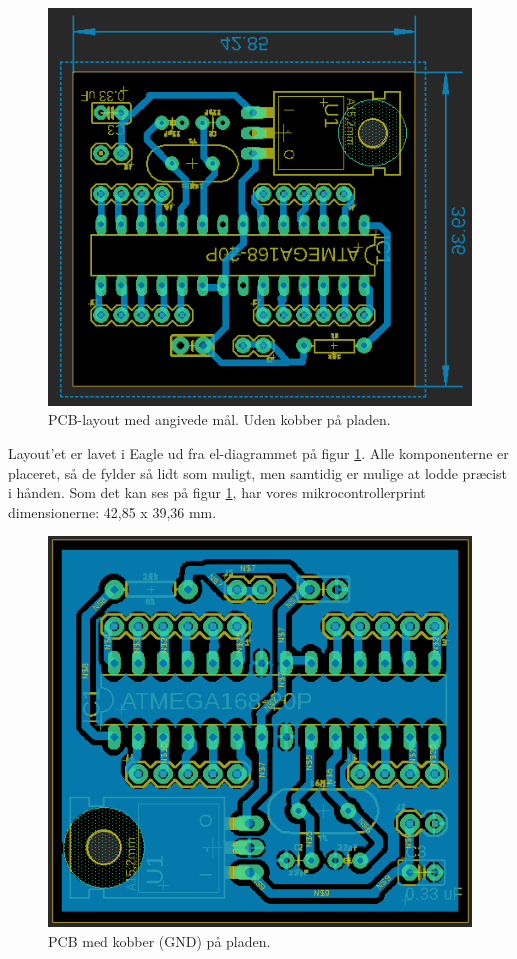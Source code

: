 \begin{figure}[H]
\centering
\includegraphics[scale=0.8]{Billeder/PCB_uden_kobber.PNG}
\caption{PCB-layout med angivede mål. Uden kobber på pladen.}
\label{fig:PCB}
\end{figure}

Layout’et er lavet i Eagle ud fra el-diagrammet på figur \ref{fig:PCB}. Alle komponenterne er placeret, så de fylder så lidt som muligt, men samtidig er mulige at lodde præcist i hånden. Som det kan ses på figur \ref{fig:PCB}, har vores mikrocontrollerprint dimensionerne: 42,85 x 39,36 mm.

\begin{figure}[H]
\centering
\includegraphics[scale=0.8]{Billeder/PCB_med_kobber.PNG}
\caption{PCB med kobber (GND) på pladen.}
\label{fig:PCB_kobber}
\end{figure}

